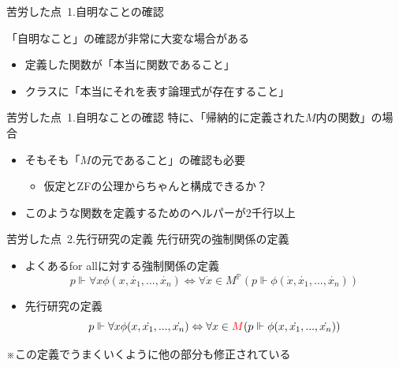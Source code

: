 \documentclass[17pt,aspectratio=169]{beamer}
\newcommand{\Pbb}{\mathbb{P}}
\begin{document}
\begin{frame}{苦労した点\, {\normalsize 1.自明なことの確認}}

    「自明なこと」の確認が非常に大変な場合がある

    {\small
    \begin{itemize}
        \item 定義した関数が「本当に関数であること」
        \item クラスに「本当にそれを表す論理式が存在すること」
    \end{itemize}
    }
\end{frame}

\begin{frame}{苦労した点\, {\normalsize 1.自明なことの確認}}
    特に、「帰納的に定義された$M$内の関数」の場合

    {\small
    \begin{itemize}
        \item そもそも「$M$の元であること」の確認も必要
              {\footnotesize
              \begin{itemize}
                  \item 仮定とZFの公理からちゃんと構成できるか？
              \end{itemize}}
        \item このような関数を定義するためのヘルパーが2千行以上
    \end{itemize}
    }
\end{frame}

\begin{frame}{苦労した点\, {\normalsize 2.先行研究の定義}}
    先行研究の強制関係の定義
    {\small
    \begin{itemize}[itemsep=8pt]
        \item よくあるfor allに対する強制関係の定義
              $$ p \Vdash \forall x \phi(x, \dot{x_1}, ..., \dot{x_n}) \Leftrightarrow \forall \dot{x} \in M^\Pbb(p \Vdash \phi(\dot{x}, \dot{x_1}, ..., \dot{x_n})) $$
        \item 先行研究の定義
              $$ p \Vdash \forall x \phi(x, \dot{x_1}, ..., \dot{x_n}) \Leftrightarrow \forall x \in \textcolor{red}{M}(p \Vdash \phi(x, \dot{x_1}, ..., \dot{x_n})) $$
    \end{itemize}
    \vspace{-6pt}
    \hspace{1cm}※この定義でうまくいくように他の部分も修正されている
    }
\end{frame}
\end{document}
